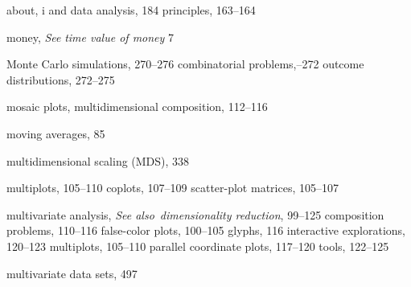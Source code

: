 \documentclass{Oreilly5980006}
\def\seealso{{\it See also}\ }
\begin{document}
\begin{theindex}
    \subitem about, i
    \subitem and data analysis, 184
    \subitem principles, 163--164
  \item money, {\it See} {\it time value of money} {7}
  \item Monte Carlo simulations, 270--276
    \subitem combinatorial problems,--272
    \subitem outcome distributions, 272--275
  \item mosaic plots, multidimensional composition, 112--116
  \item moving averages, 85
  \item multidimensional scaling (MDS), 338
  \item multiplots, 105--110
    \subitem coplots, 107--109
    \subitem scatter-plot matrices, 105--107
  \item multivariate analysis, \seealso{\it dimensionality reduction}, 
		99--125
    \subitem composition problems, 110--116
    \subitem false-color plots, 100--105
    \subitem glyphs, 116
    \subitem interactive explorations, 120--123
    \subitem multiplots, 105--110
    \subitem parallel coordinate plots, 117--120
    \subitem tools, 122--125
  \item multivariate data sets, 497

  \indexspace


\end{theindex}
\end{document}
